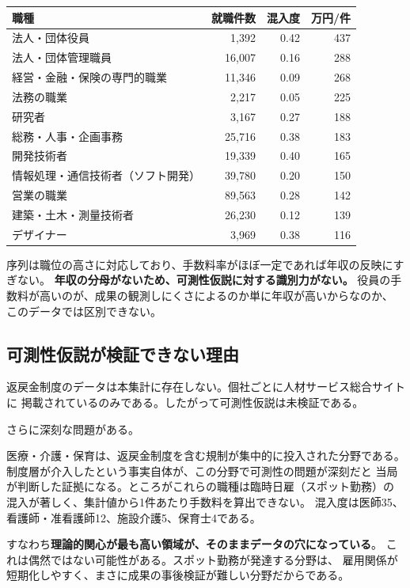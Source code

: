 \begin{center}
\begin{tabular}{@{}lrrr@{}}
\toprule
職種 & 就職件数 & 混入度 & 万円/件 \\
\midrule
法人・団体役員 & 1,392 & 0.42 & 437 \\
法人・団体管理職員 & 16,007 & 0.16 & 288 \\
経営・金融・保険の専門的職業 & 11,346 & 0.09 & 268 \\
法務の職業 & 2,217 & 0.05 & 225 \\
研究者 & 3,167 & 0.27 & 188 \\
総務・人事・企画事務 & 25,716 & 0.38 & 183 \\
開発技術者 & 19,339 & 0.40 & 165 \\
情報処理・通信技術者（ソフト開発） & 39,780 & 0.20 & 150 \\
営業の職業 & 89,563 & 0.28 & 142 \\
建築・土木・測量技術者 & 26,230 & 0.12 & 139 \\
デザイナー & 3,969 & 0.38 & 116 \\
\bottomrule
\end{tabular}
\label{tab:family5-fee-per-placement}
\end{center}

序列は職位の高さに対応しており、手数料率がほぼ一定であれば年収の反映にすぎない。
\textbf{年収の分母がないため、可測性仮説に対する識別力がない。}
役員の手数料が高いのが、成果の観測しにくさによるのか単に年収が高いからなのか、
このデータでは区別できない。

\subsection{可測性仮説が検証できない理由}

返戻金制度のデータは本集計に存在しない。個社ごとに人材サービス総合サイトに
掲載されているのみである。したがって可測性仮説は未検証である。

さらに深刻な問題がある。

\begin{remark}[データの穴が関心と一致する]
\label{rem:data-gap-relevance}
医療・介護・保育は、返戻金制度を含む規制が集中的に投入された分野である。
制度層が介入したという事実自体が、この分野で可測性の問題が深刻だと
当局が判断した証拠になる。ところがこれらの職種は臨時日雇（スポット勤務）の
混入が著しく、集計値から1件あたり手数料を算出できない。
混入度は医師35、看護師・准看護師12、施設介護5、保育士4である。

すなわち\textbf{理論的関心が最も高い領域が、そのままデータの穴になっている}。
これは偶然ではない可能性がある。スポット勤務が発達する分野は、
雇用関係が短期化しやすく、まさに成果の事後検証が難しい分野だからである。
\end{remark}

